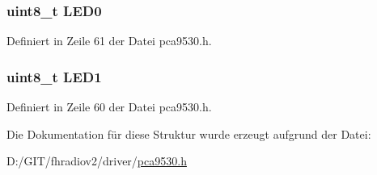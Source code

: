\subsubsection[{L\+E\+D0}]{\setlength{\rightskip}{0pt plus 5cm}uint8\+\_\+t L\+E\+D0}\label{structpca9530__sel_a698763138aab81826861fd602c87872b}


Definiert in Zeile 61 der Datei pca9530.\+h.

\hypertarget{structpca9530__sel_a40e423e01a324e06ebc015b85a9d6b8e}{}
\subsubsection[{L\+E\+D1}]{\setlength{\rightskip}{0pt plus 5cm}uint8\+\_\+t L\+E\+D1}\label{structpca9530__sel_a40e423e01a324e06ebc015b85a9d6b8e}


Definiert in Zeile 60 der Datei pca9530.\+h.



Die Dokumentation für diese Struktur wurde erzeugt aufgrund der Datei\+:\begin{DoxyCompactItemize}
\item 
D\+:/\+G\+I\+T/fhradiov2/driver/\hyperlink{pca9530_8h}{pca9530.\+h}\end{DoxyCompactItemize}
